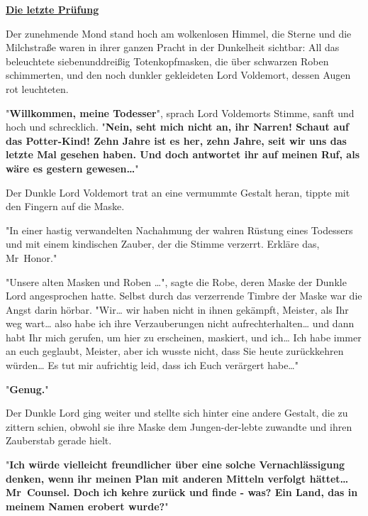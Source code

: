 

\hypertarget{die-letzte-pruxfcfung}{%

\textbf{\uline{Die letzte Prüfung}}

Der zunehmende Mond stand hoch am wolkenlosen Himmel, die Sterne und die Milchstraße waren in ihrer ganzen Pracht in der Dunkelheit sichtbar: All das beleuchtete siebenunddreißig Totenkopfmasken, die über schwarzen Roben schimmerten, und den noch dunkler gekleideten Lord Voldemort, dessen Augen rot leuchteten.

"\textbf{Willkommen, meine Todesser}", sprach Lord Voldemorts Stimme, sanft und hoch und schrecklich. "\textbf{Nein, seht mich nicht an, ihr Narren! Schaut auf das Potter-Kind! Zehn Jahre ist es her, zehn Jahre, seit wir uns das letzte Mal gesehen haben. Und doch antwortet ihr auf meinen Ruf, als wäre es gestern gewesen…}"

Der Dunkle Lord Voldemort trat an eine vermummte Gestalt heran, tippte mit den Fingern auf die Maske.

"In einer hastig verwandelten Nachahmung der wahren Rüstung eines Todessers und mit einem kindischen Zauber, der die Stimme verzerrt. Erkläre das, Mr~Honor."

"Unsere alten Masken und Roben …", sagte die Robe, deren Maske der Dunkle Lord angesprochen hatte. Selbst durch das verzerrende Timbre der Maske war die Angst darin hörbar. "Wir… wir haben nicht in ihnen gekämpft, Meister, als Ihr weg wart… also habe ich ihre Verzauberungen nicht aufrechterhalten… und dann habt Ihr mich gerufen, um hier zu erscheinen, maskiert, und ich… Ich habe immer an euch geglaubt, Meister, aber ich wusste nicht, dass Sie heute zurückkehren würden… Es tut mir aufrichtig leid, dass ich Euch verärgert habe…"

"\textbf{Genug.}"

Der Dunkle Lord ging weiter und stellte sich hinter eine andere Gestalt, die zu zittern schien, obwohl sie ihre Maske dem Jungen-der-lebte zuwandte und ihren Zauberstab gerade hielt.

"\textbf{Ich würde vielleicht freundlicher über eine solche Vernachlässigung denken, wenn ihr meinen Plan mit anderen Mitteln verfolgt hättet… Mr~Counsel. Doch ich kehre zurück und finde - was? Ein Land, das in meinem Namen erobert wurde?}"

}
